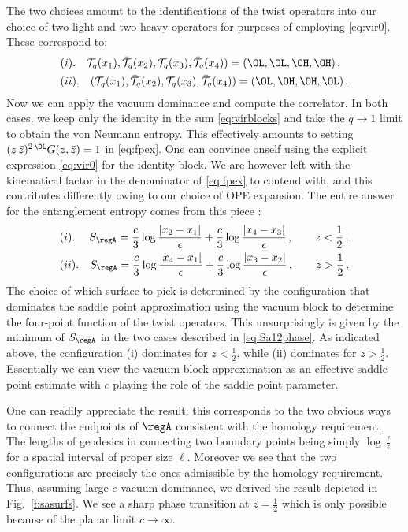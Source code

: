 \documentclass[12pt,openany]{book}
\begin{document}
The two choices amount to the identifications of the twist operators into our choice of two light and two heavy operators for purposes of employing \eqref{eq:vir0}. These correspond to:
%
\begin{equation}
\begin{split}
&(i).\quad  {\cal T}_q(x_1),\bar{{\cal T}}_q(x_2),{\cal T}_q(x_3),\bar{{\cal T}}_q(x_4))=(\OL,\OL,\OH,\OH) \,, \\
& (ii). \quad ({\cal T}_q(x_1),\bar{{\cal T}}_q(x_2),{\cal T}_q(x_3),\bar{{\cal T}}_q(x_4))=(\OL,\OH,\OH,\OL) \,.
\end{split}
\label{}
\end{equation}
%
Now we can apply the vacuum dominance and compute the correlator.   In both cases, we keep only the identity in the sum \eqref{eq:virblocks} and take the $q\to 1$ limit to obtain the von Neumann entropy. This effectively amounts to setting $(z\,{\bar z})^{2\,\DL} G(z,{\bar z} )=1$ in \eqref{eq:fpex}. One can  convince onself using the explicit expression \eqref{eq:vir0} for the identity block.  We are however left with the kinematical factor in the denominator of \eqref{eq:fpex} to contend with, and this contributes differently owing to our choice of OPE expansion. The entire answer for the entanglement entropy comes from this  piece :
%
\begin{equation}
\begin{split}
& (i). \quad \;S_\regA=\frac{c}{3}\log\frac{|x_2-x_1|}{\epsilon}+\frac{c}{3}\log\frac{|x_4-x_3|}{\epsilon} \,,  \qquad  z< \frac{1}{2}\,,\\
& (ii). \quad S_\regA =\frac{c}{3}\log\frac{|x_4-x_1|}{\epsilon}+\frac{c}{3}\log\frac{|x_3-x_2|}{\epsilon} \,,  \qquad z> \frac{1}{2}\,.
\end{split}
\label{eq:Sa12phase}
\end{equation}
%
The choice of which surface to pick is determined by the configuration that dominates the saddle point approximation using the vacuum block to determine the four-point function of the twist operators. This unsurprisingly is given by the minimum of $S_\regA$ in the two cases described in \eqref{eq:Sa12phase}. As indicated above, the configuration (i) dominates for $z<\frac{1}{2}$, while (ii) dominates for $z >\frac{1}{2}$. Essentially we can view the vacuum block approximation as an effective saddle point estimate with $c$ playing the role of the saddle point parameter.

One can readily appreciate the result: this corresponds to the two obvious ways to connect the endpoints of $\regA$ consistent with the homology requirement. The lengths of geodesics in  connecting two boundary points being simply $\log\frac{\ell}{\epsilon}$ for a spatial interval of proper size $\ell $. Moreover we see that the two configurations are precisely the ones admissible by the homology requirement. Thus,  assuming large $c$ vacuum dominance,
we derived the result depicted in Fig.~\ref{f:sasurfs}. We see a sharp phase transition at $z=\frac{1}{2}$ which is only possible because of the planar limit $c\to \infty$.
\end{document}
